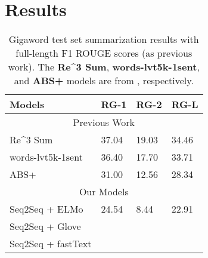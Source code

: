 \section{Results}
\label{sec: result}

\begin{table}[ht]
\centering
\caption{Gigaword test set summarization results with full-length F1 ROUGE scores (as previous work). The \textbf{Re\^{}3 Sum}, \textbf{words-lvt5k-1sent}, and \textbf{ABS+} models are from \cite{cao2018retrieve, nallapati2016abstractive, rush2015neural}, respectively.}
\begin{tabular}{|l|l|l|l|} 
\hline
Models                                        & \multicolumn{1}{c|}{RG-1} & \multicolumn{1}{c|}{RG-2} & \multicolumn{1}{c|}{RG-L}  \\ 
\hline
\multicolumn{4}{|c|}{Previous Work}                                                                                                         \\ 
\hline
Re\^{}3 Sum         & 37.04                        & 19.03                        & 34.46                         \\ 
\hline
words-lvt5k-1sent & 36.40                        & 17.70                        & 33.71                         \\ 
\hline
ABS+               & 31.00                        & 12.56                        & 28.34                         \\ 
\hline
\multicolumn{4}{|c|}{Our Models}                                                                                                            \\ 
\hline
Seq2Seq + ELMo                                & 24.54                             & 8.44                             & 22.91                               \\ 
\hline
Seq2Seq + Glove                               &                              &                              &                               \\ 
\hline
Seq2Seq + fastText                            &                              &                              &                               \\
\hline
\end{tabular}
\label{tab: compare_embed}
\end{table}


